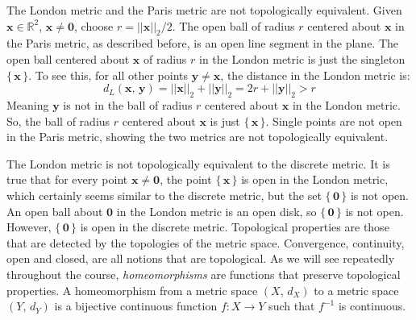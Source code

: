 \documentclass{article}
\theoremstyle{plain}
\theoremstyle{normal}
\newenvironment{example}{%
    \pushQED{\qed}\renewcommand{\qedsymbol}{$\blacksquare$}\examplex%
}{%
    \popQED\endexamplex%
}
\newenvironment{definition}{%
    \pushQED{\qed}\renewcommand{\qedsymbol}{$\blacksquare$}\definitionx%
}{%
    \popQED\enddefinitionx%
}
\begin{document}
        \begin{example}
            The London metric and the Paris metric are not topologically
            equivalent. Given
            $\mathbf{x}\in\mathbb{R}^{2}$, $\mathbf{x}\ne\mathbf{0}$, choose
            $r=||\mathbf{x}||_{2}/2$. The open ball of radius $r$ centered about
            $\mathbf{x}$ in the Paris metric, as described before, is an open
            line segment in the plane. The open ball centered about
            $\mathbf{x}$ of radius $r$ in the London metric is just the
            singleton $\{\,\mathbf{x}\,\}$. To see this, for all other points
            $\mathbf{y}\ne\mathbf{x}$, the distance in the London metric is:
            \begin{equation}
                d_{L}(\mathbf{x},\,\mathbf{y})=
                    ||\mathbf{x}||_{2}+||\mathbf{y}||_{2}
                    =2r+||\mathbf{y}||_{2}>r
            \end{equation}
            Meaning $\mathbf{y}$ is not in the ball of radius $r$ centered about
            $\mathbf{x}$ in the London metric. So, the ball of radius $r$
            centered about $\mathbf{x}$ is just $\{\,\mathbf{x}\,\}$. Single
            points are not open in the Paris metric, showing the two metrics
            are not topologically equivalent.
        \end{example}
        \begin{example}
            The London metric is not topologically equivalent to the discrete
            metric. It is true that for every point $\mathbf{x}\ne\mathbf{0}$,
            the point $\{\,\mathbf{x}\,\}$ is open in the London metric, which
            certainly seems similar to the discrete metric, but the set
            $\{\,\mathbf{0}\,\}$ is not open. An open ball about
            $\mathbf{0}$ in the London metric is an open disk, so
            $\{\,\mathbf{0}\,\}$ is not open. However, $\{\,\mathbf{0}\,\}$
            is open in the discrete metric.
        \end{example}
        Topological properties are those that are detected by the
        topologies of the metric space. Convergence, continuity, open and
        closed, are all notions that are topological. As we will see
        repeatedly throughout the course, \textit{homeomorphisms} are functions
        that preserve topological properties.
        \begin{definition}[\textbf{Homeomorphism}]
            A homeomorphism from a metric space $(X,\,d_{X})$ to a metric space
            $(Y,\,d_{Y})$ is a bijective continuous function $f:X\rightarrow{Y}$
            such that $f^{-1}$ is continuous.
        \end{definition}
\end{document}
